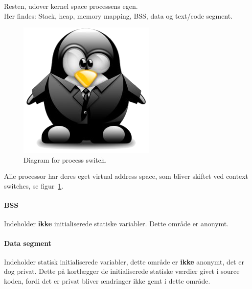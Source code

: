 Resten, udover kernel space processens egen.\\

Her findes: Stack, heap, memory mapping, BSS, data og text/code segment.

\begin{figure}[H]
	\centering
	\includegraphics[width=\linewidth]{figs/memoryspace}
	\caption{Diagram for process switch.}
	\label{fig:memoryspace}
\end{figure}

Alle processor har deres eget virtual address space, som bliver skiftet ved context switches, se figur~\ref{fig:memoryspace}. 

\paragraph{BSS}
Indeholder \textbf{ikke} initialiserede statiske variabler. Dette område er anonymt.

\paragraph{Data segment}
Indeholder statisk initialiserede variabler, dette område er \textbf{ikke} anonymt, det er dog privat. Dette på kortlægger de initialiserede statiske værdier givet i source koden, fordi det er privat bliver ændringer ikke gemt i dette område.\\

